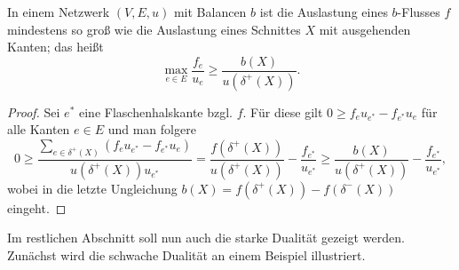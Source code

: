 \begin{theorem}\label{thm-weak-duality-min-con-flow}
 	In einem Netzwerk $(V, E, u)$ mit Balancen $b$ ist die Auslastung eines $b$-Flusses $f$ mindestens so groß wie die Auslastung eines Schnittes $X$ mit ausgehenden Kanten; das heißt \[\max_{e\in E} \frac{f_e}{u_e} \geq \frac{b(X)}{u(\delta^+(X))}.\]
\end{theorem}
\begin{proof}
	Sei $e^*$ eine Flaschenhalskante bzgl. $f$.
	Für diese gilt $0\geq f_e u_{e^*} - f_{e^*}u_e$ für alle Kanten $e\in E$ und man folgere
	\[
	0\geq \frac{\sum_{e\in \delta^+(X)}(f_e u_{e^*} - f_{e^*}u_e)}{u(\delta^+(X)) u_{e^*}} = \frac{f(\delta^+(X))}{u(\delta^+(X))} - \frac{f_{e^*}}{u_{e^*}} \geq \frac{b(X)}{u(\delta^+(X))} - \frac{f_{e^*}}{u_{e^*}},
	\]
	wobei in die letzte Ungleichung $b(X) = f(\delta^+(X)) - f(\delta^-(X))$ eingeht.
\end{proof}

Im restlichen Abschnitt soll nun auch die starke Dualität gezeigt werden.
Zunächst wird die schwache Dualität an einem Beispiel illustriert.

